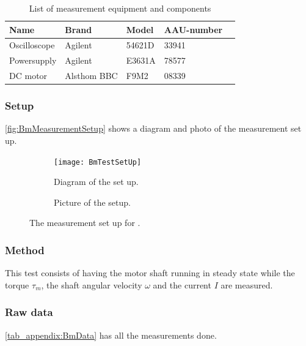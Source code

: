 \begin{table}[htbp]
	\centering
	\caption{List of measurement equipment and components}\label{tab_appendix:BmSetUp}
	
	\begin{tabularx}{\textwidth}{lXXXX}
		Name 				& Brand	& Model & AAU-number									\\ \toprule \rowcolor{lightGrey}
		Oscilloscope	& Agilent & 54621D & 33941 	\\
		Powersupply	& Agilent & E3631A & 78577\\ \rowcolor{lightGrey}
		DC motor & Alsthom BBC & F9M2& 08339
	\end{tabularx}
\end{table}

\subsubsection*{Setup}
\autoref{fig:BmMeasurementSetup} shows a diagram and photo of the measurement set up.
\begin{figure}[htbp]
	\centering
	\begin{subfigure}{0.50\textwidth}
		\texttt{[image: BmTestSetUp]}
		\caption{Diagram of the set up.} \label{fig:BmMeasurementDiagram}
	\end{subfigure}
	\begin{subfigure}{0.40\textwidth}
		\caption{Picture of the setup.} \label{fig:BmMeasurementPictures}
	\end{subfigure}
	\caption{The measurement set up for .} \label{fig:BmMeasurementSetup}   
\end{figure}

\subsubsection*{Method}
This test consists of having the motor shaft running in steady state while the torque $\tau_m$, the shaft angular velocity $\omega$ and the current $I$ are measured.

\subsubsection*{Raw data}
\autoref{tab_appendix:BmData} has all the measurements done.

